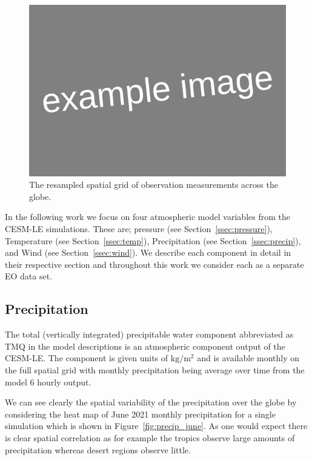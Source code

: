  \begin{figure}[htbp!] 
 	\centering    
 	\includegraphics[width=1.0\textwidth]{Example_image}
 	\caption[CESM-LE resampled spatial grid]{The resampled spatial grid of observation measurements across the globe.}
 	\label{fig:cesm_grid}
 \end{figure}
 
 
 
  In the following work we  focus on four atmospheric model variables from the  CESM-LE simulations. These are; pressure (see Section~\ref{ssec:pressure}), Temperature (see Section~\ref{ssec:temp}), Precipitation (see Section~\ref{ssec:precip}), and Wind (see Section~\ref{ssec:wind}). We describe each component in detail in their respective section and throughout this work we consider each as a separate EO data set. 

\subsection{Precipitation \label{ssec:precip}}
The total (vertically integrated) precipitable water component abbreviated as TMQ in the model descriptions is an atmospheric component output of the CESM-LE. The component is given units of $\si{\kilogram\per\metre\squared} $ and is available monthly on the full spatial grid with monthly precipitation being average over time from the model 6 hourly output. 

We can see clearly the spatial variability of the precipitation over the globe by considering the heat map of June 2021 monthly precipitation for a single simulation which is shown in Figure~\ref{fig:precip_june}. As one would expect there is clear spatial correlation as for example the tropics observe large amounts of precipitation whereas desert regions observe little. 
 

